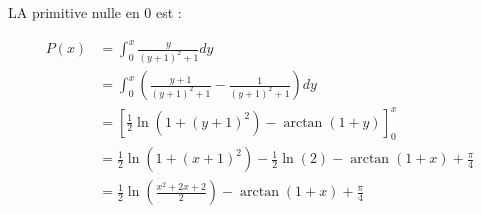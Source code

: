 \documentclass[a4paper,10pt]{report}
\begin{document}
LA primitive nulle en $0$ est :

\begin{equation*}
	\begin{split}
		P(x) &= \int_0^x \frac{y}{(y+1)^2 +1} dy \\
		     &= \int_0^x \left( \frac{y+1}{(y+1)^2 +1} -  \frac{1}{(y+1)^2 +1}\right) dy \\
		     &= \left[ \frac{1}{2}\ln( 1 + (y+1)^2) -\arctan(1+y) \right]_0^x \\
		     &= \frac{1}{2}\ln( 1 + (x+1)^2) - \frac{1}{2}\ln( 2) - \arctan(1+x) + \frac{\pi}{4} \\
		     &= \frac{1}{2}\ln\left(\frac{x^2 +2x +2}{2}\right) - \arctan(1+x) + \frac{\pi}{4}
	\end{split}
\end{equation*}
\end{document}
